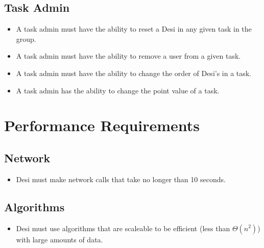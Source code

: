 \documentclass[11pt, a4paper]{report}
\begin{document}
\subsection{Task Admin}
\begin{itemize}
\item A task admin must have the ability to reset a Desi in any given task in the group.
\item A task admin must have the ability to remove a user from a given task.
\item A task admin must have the ability to change the order of Desi's in a task.
\item A task admin has the ability to change the point value of a task.
\end{itemize}


\section{Performance Requirements}
\subsection{Network}
\begin{itemize}
\item Desi must make network calls that take no longer than 10 seconds.
\end{itemize}
\subsection{Algorithms}
\begin{itemize}
\item Desi must use algorithms that are scaleable to be efficient (less than $\Theta(n^2)$) with large amounts of data.
\end{itemize}
\end{document}
